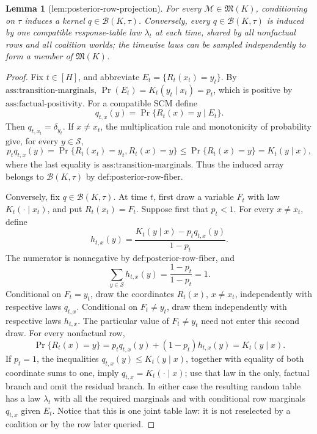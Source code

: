 \documentclass{article}
\newtheorem{lemma}{Lemma}
\begin{document}
\begin{lemma}[lem:posterior-row-projection]\label{lem:posterior-row-projection}
For every \(\mathcal M\in\mathfrak M(K)\), conditioning on \(\tau\) induces a kernel \(q\in\mathcal B(K,\tau)\). Conversely, every \(q\in\mathcal B(K,\tau)\) is induced by one compatible response-table law \(\lambda_t\) at each time, shared by all nonfactual rows and all coalition worlds; the timewise laws can be sampled independently to form a member of \(\mathfrak M(K)\).
\end{lemma}
\begin{proof}
Fix \(t\in[H]\), and abbreviate \(E_t=\{R_t(x_t)=y_t\}\).  By \(\text{ass:transition-marginals}\), \(\Pr(E_t)=K_t(y_t\mid x_t)=p_t\), which is positive by \(\text{ass:factual-positivity}\).  For a compatible SCM define
\[
 q_{t,x}(y)=\Pr\{R_t(x)=y\mid E_t\}.
\]
Then \(q_{t,x_t}=\delta_{y_t}\).  If \(x\ne x_t\), the multiplication rule and monotonicity of probability give, for every \(y\in\mathcal S\),
\[
 p_tq_{t,x}(y)
 =\Pr\{R_t(x_t)=y_t,R_t(x)=y\}
 \le \Pr\{R_t(x)=y\}
 =K_t(y\mid x),
\]
where the last equality is \(\text{ass:transition-marginals}\).  Thus the induced array belongs to \(\mathcal B(K,\tau)\) by \(\text{def:posterior-row-fiber}\).

Conversely, fix \(q\in\mathcal B(K,\tau)\).  At time \(t\), first draw a variable \(F_t\) with law \(K_t(\cdot\mid x_t)\), and put \(R_t(x_t)=F_t\).  Suppose first that \(p_t<1\).  For every \(x\ne x_t\), define
\[
 h_{t,x}(y)=\frac{K_t(y\mid x)-p_tq_{t,x}(y)}{1-p_t}.
\]
The numerator is nonnegative by \(\text{def:posterior-row-fiber}\), and
\[
 \sum_{y\in\mathcal S}h_{t,x}(y)
 =\frac{1-p_t}{1-p_t}=1.
\]
Conditional on \(F_t=y_t\), draw the coordinates \(R_t(x)\), \(x\ne x_t\), independently with respective laws \(q_{t,x}\).  Conditional on \(F_t\ne y_t\), draw them independently with respective laws \(h_{t,x}\).  The particular value of \(F_t\ne y_t\) need not enter this second draw.  For every nonfactual row,
\[
 \Pr\{R_t(x)=y\}
 =p_tq_{t,x}(y)+(1-p_t)h_{t,x}(y)
 =K_t(y\mid x).
\]
If \(p_t=1\), the inequalities \(q_{t,x}(y)\le K_t(y\mid x)\), together with equality of both coordinate sums to one, imply \(q_{t,x}=K_t(\cdot\mid x)\); use that law in the only, factual branch and omit the residual branch.  In either case the resulting random table has a law \(\lambda_t\) with all the required marginals and with conditional row marginals \(q_{t,x}\) given \(E_t\).  Notice that this is one joint table law: it is not reselected by a coalition or by the row later queried.


\end{proof}
\end{document}

